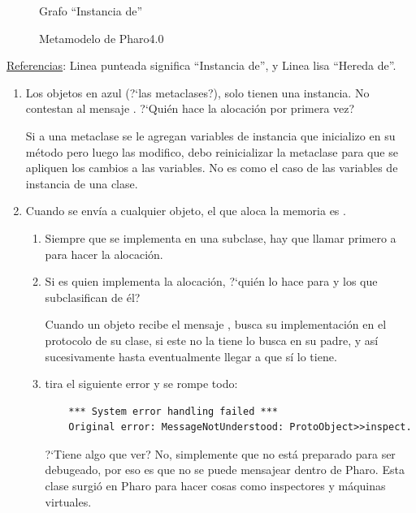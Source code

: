 \begin{figure}[H]
\begin{minipage}{.5\textwidth}
  \caption{Grafo ``Instancia de''}
  \label{fig:sub2}
\end{minipage}
\caption{Metamodelo de Pharo4.0}
\label{fig:test}
\end{figure}

\underline{Referencias}: Linea punteada significa ``Instancia de'', y Linea lisa ``Hereda de''.

\begin{enumerate}
 \item Los objetos en azul (?`las metaclases?), solo tienen una instancia. No contestan al mensaje . ?`Qui\'en hace la alocaci\'on por primera vez? 
 
 Si a una metaclase se le agregan variables de instancia que inicializo en su m\'etodo  pero luego las modifico, debo reinicializar la metaclase para que se apliquen los cambios a las variables. No es como el caso de las variables de instancia de una clase. 
 
 \item Cuando se env\'ia  a cualquier objeto, el que aloca la memoria es . 
  \begin{enumerate}
    \item Siempre que se implementa  en una subclase, hay que llamar primero a  para hacer la alocaci\'on. 
    
    \item Si es  quien implementa la alocaci\'on, ?`qui\'en lo hace para  y los que subclasifican de \'el? 
    
    Cuando un objeto recibe el mensaje , busca su implementaci\'on en el protocolo de su clase, si este no la tiene lo busca en su padre, y as\'i sucesivamente hasta eventualmente llegar a  que s\'i lo tiene. 
    
    \item {} tira el siguiente error y se rompe todo: 

	\begin{verbatim}
	*** System error handling failed ***
	Original error: MessageNotUnderstood: ProtoObject>>inspect.
	\end{verbatim}

	?`Tiene algo que ver? No, simplemente que  no est\'a preparado para ser debugeado, por eso es que no se puede mensajear dentro de Pharo. Esta clase surgi\'o en Pharo para hacer cosas como inspectores y m\'aquinas virtuales. 
    

\end{enumerate}
\end{enumerate}
